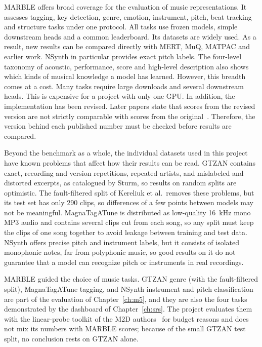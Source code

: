 \documentclass{FastFyp}
\begin{document}
\lrcritical
MARBLE offers broad coverage for the evaluation of music representations. It assesses tagging, key detection, genre, emotion, instrument, pitch, beat tracking and structure tasks under one protocol. All tasks use frozen models, simple downstream heads and a common leaderboard. Its datasets are widely used. As a result, new results can be compared directly with MERT, MuQ, MATPAC and earlier work. NSynth in particular provides exact pitch labels. The four-level taxonomy of acoustic, performance, score and high-level description also shows which kinds of musical knowledge a model has learned. However, this breadth comes at a cost. Many tasks require large downloads and several downstream heads. This is expensive for a project with only one GPU. In addition, the implementation has been revised. Later papers state that scores from the revised version are not strictly comparable with scores from the original~\cite{ref:Gu:2026pupum2d}. Therefore, the version behind each published number must be checked before results are compared.

Beyond the benchmark as a whole, the individual datasets used in this project have known problems that affect how their results can be read. GTZAN contains exact, recording and version repetitions, repeated artists, and mislabeled and distorted excerpts, as catalogued by Sturm, so results on random splits are optimistic. The fault-filtered split of Kereliuk et al.\ removes these problems, but its test set has only 290 clips, so differences of a few points between models may not be meaningful. MagnaTagATune is distributed as low-quality 16~kHz mono MP3 audio and contains several clips cut from each song, so any split must keep the clips of one song together to avoid leakage between training and test data. NSynth offers precise pitch and instrument labels, but it consists of isolated monophonic notes, far from polyphonic music, so good results on it do not guarantee that a model can recognize pitch or instruments in real recordings.

\lrrelation
MARBLE guided the choice of music tasks. GTZAN genre (with the fault-filtered split), MagnaTagATune tagging, and NSynth instrument and pitch classification are part of the evaluation of Chapter~\ref{ch:m5}, and they are also the four tasks demonstrated by the dashboard of Chapter~\ref{ch:srs}. The project evaluates them with the linear-probe toolkit of the M2D authors~\cite{ref:EVARGit} for budget reasons and does not mix its numbers with MARBLE scores; because of the small GTZAN test split, no conclusion rests on GTZAN alone.
\end{document}
